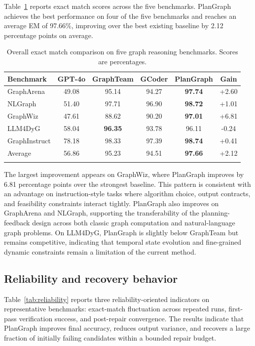 \documentclass[pdflatex,sn-mathphys-num]{sn-jnl}
\theoremstyle{thmstyleone}
\theoremstyle{thmstyletwo}
\theoremstyle{thmstylethree}
\begin{document}
Table~\ref{tab:overall} reports exact match scores across the five benchmarks. PlanGraph achieves the best performance on four of the five benchmarks and reaches an average EM of 97.66\%, improving over the best existing baseline by 2.12 percentage points on average.

\begin{table}[t]
\caption{Overall exact match comparison on five graph reasoning benchmarks. Scores are percentages.}
\label{tab:overall}
\begin{tabular}{@{}lccccc@{}}
\toprule
Benchmark & GPT-4o & GraphTeam & GCoder & PlanGraph & Gain \\
\midrule
GraphArena & 49.08 & 95.14 & 94.27 & \textbf{97.74} & +2.60 \\
NLGraph & 51.40 & 97.71 & 96.90 & \textbf{98.72} & +1.01 \\
GraphWiz & 47.61 & 88.62 & 90.20 & \textbf{97.01} & +6.81 \\
LLM4DyG & 58.04 & \textbf{96.35} & 93.78 & 96.11 & -0.24 \\
GraphInstruct & 78.18 & 98.33 & 97.39 & \textbf{98.74} & +0.41 \\
\midrule
Average & 56.86 & 95.23 & 94.51 & \textbf{97.66} & +2.12 \\
\botrule
\end{tabular}
\end{table}

The largest improvement appears on GraphWiz, where PlanGraph improves by 6.81 percentage points over the strongest baseline. This pattern is consistent with an advantage on instruction-style tasks where algorithm choice, output contracts, and feasibility constraints interact tightly. PlanGraph also improves on GraphArena and NLGraph, supporting the transferability of the planning-feedback design across both classic graph computation and natural-language graph problems. On LLM4DyG, PlanGraph is slightly below GraphTeam but remains competitive, indicating that temporal state evolution and fine-grained dynamic constraints remain a limitation of the current method.

\subsection{Reliability and recovery behavior}

Table~\ref{tab:reliability} reports three reliability-oriented indicators on representative benchmarks: exact-match fluctuation across repeated runs, first-pass verification success, and post-repair convergence. The results indicate that PlanGraph improves final accuracy, reduces output variance, and recovers a large fraction of initially failing candidates within a bounded repair budget.
\end{document}
